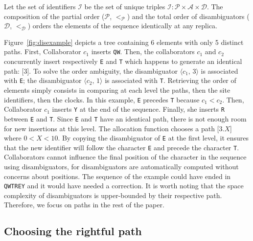 Let the set of identifiers $\mathcal{I}$ be the set of unique triples
$\mathcal{I}:\mathcal{P}\times \mathcal{A}\times \mathcal{D}$. The composition
of the partial order ($\mathcal{P}$, $<_{\mathcal{P}}$) and the total order of
disambiguators ($\mathcal{D}$, $<_{\mathcal{D}}$) orders the elements of the
sequence identically at any replica.

Figure~\ref{fig:disexample} depicts a tree containing 6 elements with only 5
distinct paths. First, Collaborator $c_1$ inserts \texttt{QW}.  Then, the
collaborators $c_1$ and $c_2$ concurrently insert respectively \texttt{E} and
\texttt{T} which happens to generate an identical path: [$3$]. To solve the
order ambiguity, the disambiguator $\langle c_1,\, 3\rangle$ is associated with
\texttt{E}; the disambiguator $\langle c_2,\, 1\rangle$ is associated with
\texttt{T}. Retrieving the order of elements simply consists in comparing at
each level the paths, then the site identifiers, then the clocks. In this
example, \texttt{E} precedes \texttt{T} because $c_1 < c_2$. Then, Collaborator
$c_1$ inserts \texttt{Y} at the end of the sequence. Finally, she inserts
\texttt{R} between \texttt{E} and \texttt{T}. Since \texttt{E} and \texttt{T}
have an identical path, there is not enough room for new insertions at this
level. The allocation function chooses a path [$3.X$] where $0<X<10$. By copying
the disambiguator of \texttt{E} at the first level, it ensures that the new
identifier will follow the character \texttt{E} and precede the character
\texttt{T}.  Collaborators cannot influence the final position of the character
in the sequence using disambiguators, for disambiguators are automatically
computed without concerns about positions. The sequence of the example could
have ended in \texttt{QWTREY} and it would have needed a correction. It is worth
noting that the space complexity of disambiguators is upper-bounded by their
respective path. Therefore, we focus on paths in the rest of the paper.

\subsection{Choosing the rightful path}
\label{subsec:choosing}


